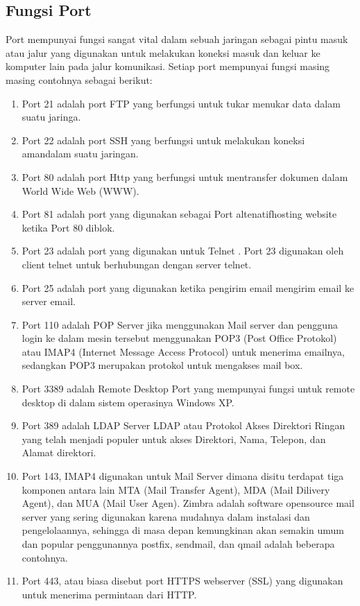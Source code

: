\documentclass[12pt,a4paper]{article}
\begin{document}
\subsection{Fungsi Port}
\hspace{1cm}
Port mempunyai fungsi sangat vital dalam sebuah jaringan sebagai pintu masuk atau jalur yang digunakan untuk melakukan koneksi masuk dan keluar ke komputer lain pada jalur komunikasi. Setiap port mempunyai fungsi masing masing contohnya sebagai berikut:
\begin{enumerate}
\item Port 21 adalah port FTP yang berfungsi untuk tukar menukar data dalam suatu jaringa.
\item Port 22 adalah port SSH yang berfungsi untuk  melakukan koneksi amandalam suatu jaringan.
\item Port 80 adalah port Http yang berfungsi untuk mentransfer dokumen dalam World Wide Web (WWW).
\item Port 81 adalah port yang digunakan sebagai Port altenatifhosting website ketika Port 80 diblok.
\item Port 23 adalah port yang digunakan untuk Telnet . Port 23 digunakan oleh client telnet untuk berhubungan dengan server telnet.
\item Port 25 adalah port yang digunakan ketika pengirim email  mengirim email ke server email.
\item Port 110 adalah POP Server  jika menggunakan Mail server dan pengguna login ke dalam mesin tersebut menggunakan POP3 (Post Office Protokol) atau IMAP4 (Internet Message Access Protocol) untuk menerima emailnya, sedangkan POP3 merupakan protokol untuk mengakses mail box.
\item Port 3389 adalah Remote Desktop Port yang  mempunyai fungsi untuk remote desktop di dalam sistem operasinya Windows XP.
\item Port 389 adalah LDAP Server LDAP atau Protokol Akses Direktori Ringan yang telah
menjadi populer untuk akses Direktori, Nama, Telepon, dan Alamat direktori.
\item Port 143, IMAP4 digunakan untuk Mail Server dimana disitu terdapat tiga komponen antara lain MTA (Mail Transfer Agent), MDA (Mail Dilivery Agent), dan MUA (Mail User Agen). Zimbra adalah software opensource mail server yang sering digunakan karena mudahnya dalam instalasi dan pengelolaannya, sehingga di masa depan kemungkinan akan semakin umum dan popular penggunannya postfix, sendmail, dan qmail adalah beberapa contohnya.
\item Port 443, atau biasa disebut port HTTPS webserver (SSL) yang digunakan untuk menerima permintaan dari HTTP.

\end{enumerate}
\end{document}

